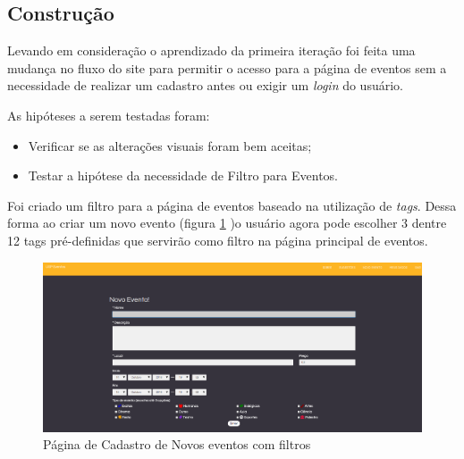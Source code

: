 \subsection{Construção}
\par Levando em consideração o aprendizado da primeira iteração foi feita uma mudança no fluxo do site para permitir o acesso para a página de eventos sem a necessidade de realizar um cadastro antes ou exigir um \emph{login} do usuário.
\par As hipóteses a serem testadas foram:
\begin{itemize}
\item Verificar se as alterações visuais foram bem aceitas;
\item Testar a hipótese da necessidade de Filtro para Eventos.
\end{itemize}
\par Foi criado um filtro para a página de eventos baseado na utilização de \emph{tags}. Dessa forma ao criar um novo evento (figura \ref{fig:event_newv2} )o usuário agora pode escolher 3 dentre 12 tags pré-definidas que servirão como filtro na página principal de eventos.
        \begin{figure}[htb]
        \centering
		\includegraphics[width=15cm]{figuras/event_newv2}
		\caption{\label{fig:event_newv2} Página de Cadastro de Novos eventos com filtros}
		\end{figure}

